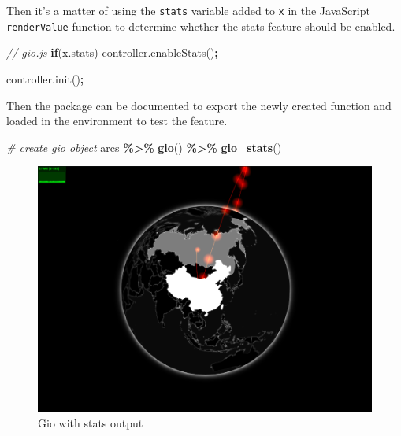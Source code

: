 \documentclass[
]{krantz}
\makeatletter
\newenvironment{Shaded}{\begin{snugshade}}{\end{snugshade}}
\newcommand{\AttributeTok}[1]{\textcolor[rgb]{0.61,0.61,0.61}{#1}}
\newcommand{\CommentTok}[1]{\textcolor[rgb]{0.37,0.37,0.37}{\textit{#1}}}
\newcommand{\ControlFlowTok}[1]{\textcolor[rgb]{0.27,0.27,0.27}{\textbf{#1}}}
\newcommand{\KeywordTok}[1]{\textcolor[rgb]{0.27,0.27,0.27}{\textbf{#1}}}
\newcommand{\NormalTok}[1]{#1}
\newcommand{\OperatorTok}[1]{\textcolor[rgb]{0.43,0.43,0.43}{\textbf{#1}}}
\newcommand{\StringTok}[1]{\textcolor[rgb]{0.5,0.5,0.5}{#1}}
\newcommand{\VariableTok}[1]{\textcolor[rgb]{0,0,0}{#1}}
\newenvironment{kframe}{%
\medskip{}
\setlength{\fboxsep}{.8em}
 \def\at@end@of@kframe{}%
 \ifinner\ifhmode%
  \def\at@end@of@kframe{\end{minipage}}%
  \begin{minipage}{\columnwidth}%
 \fi\fi%
 \def\FrameCommand##1{\hskip\@totalleftmargin \hskip-\fboxsep
 \colorbox{shadecolor}{##1}\hskip-\fboxsep
     \hskip-\linewidth \hskip-\@totalleftmargin \hskip\columnwidth}%
 \MakeFramed {\advance\hsize-\width
   \@totalleftmargin\z@ \linewidth\hsize
   \@setminipage}}%
 {\par\unskip\endMakeFramed%
 \at@end@of@kframe}
\renewenvironment{Shaded}{\begin{kframe}}{\end{kframe}}
\makeatother
\begin{document}
Then it's a matter of using the \texttt{stats} variable added to \texttt{x} in the JavaScript \texttt{renderValue} function to determine whether the stats feature should be enabled.

\begin{Shaded}
\begin{Highlighting}[]
\CommentTok{// gio.js}
\ControlFlowTok{if}\NormalTok{(}\VariableTok{x}\NormalTok{.}\AttributeTok{stats}\NormalTok{)}
  \VariableTok{controller}\NormalTok{.}\AttributeTok{enableStats}\NormalTok{()}\OperatorTok{;}

\VariableTok{controller}\NormalTok{.}\AttributeTok{init}\NormalTok{()}\OperatorTok{;}
\end{Highlighting}
\end{Shaded}

Then the package can be documented to export the newly created function and loaded in the environment to test the feature.

\begin{Shaded}
\begin{Highlighting}[]
\CommentTok{\# create gio object}
\NormalTok{arcs }\OperatorTok{\%>\%}\StringTok{ }
\StringTok{  }\KeywordTok{gio}\NormalTok{() }\OperatorTok{\%>\%}\StringTok{ }
\StringTok{  }\KeywordTok{gio\_stats}\NormalTok{()}
\end{Highlighting}
\end{Shaded}

\begin{figure}
\centering
\includegraphics{images/stats.png}
\caption{Gio with stats output}
\end{figure}
\end{document}
